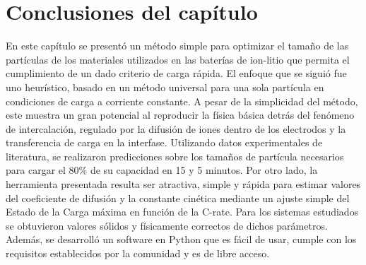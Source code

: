 \section{Conclusiones del capítulo}

En este capítulo se presentó un método simple para optimizar el tamaño de las 
partículas de los materiales utilizados en las baterías de ion-litio que permita
el cumplimiento de un dado criterio de carga rápida. El enfoque que se siguió
fue uno heurístico, basado en un método universal para una sola partícula en
condiciones de carga a corriente constante. A pesar de la simplicidad del método, 
este muestra un gran potencial al reproducir la física básica detrás del 
fenómeno de intercalación, regulado por la difusión de iones dentro de los 
electrodos y la transferencia de carga en la interfase. Utilizando datos 
experimentales de literatura, se realizaron predicciones sobre los tamaños de
partícula necesarios para cargar el 80\% de su capacidad en 15 y 5 minutos. 
Por otro lado, la herramienta presentada resulta ser atractiva, simple y rápida 
para estimar valores del coeficiente de difusión y la constante cinética mediante
un ajuste simple del Estado de la Carga máxima en función de la C-rate. Para los 
sistemas estudiados se obtuvieron valores sólidos y físicamente correctos de
dichos parámetros. Además, se desarrolló un software en Python que es fácil 
de usar, cumple con los requisitos establecidos por la comunidad y es de libre
acceso.
